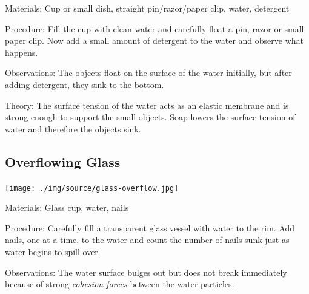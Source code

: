 \begin{multicols}{2}
\begin{description*}
\item[Materials:]{Cup or small dish, straight pin/razor/paper clip, water, detergent}
\item[Procedure:]{Fill the cup with clean water and carefully float a pin, razor or small paper clip. Now add a small amount of detergent to the water and observe what happens.}
\item[Observations:]{The objects float on the surface of the water initially, but after adding detergent, they sink to the bottom.}
\item[Theory:]{The surface tension of the water acts as an elastic membrane and is strong enough to support the small objects. Soap lowers the surface tension of water and therefore the objects sink.}
\end{description*}

\columnbreak

\subsection{Overflowing Glass}

\begin{center}
\texttt{[image: ./img/source/glass-overflow.jpg]}
\end{center}

\begin{description*}
\item[Materials:]{Glass cup, water, nails}
\item[Procedure:]{Carefully fill a transparent glass vessel with water to the rim. Add nails, one at a time, to
the water and count the number of nails sunk just as water begins to spill over.}
\item[Observations:]{The water surface bulges out but does not break immediately because of strong \emph{cohesion
forces} between the water particles.}
\end{description*}


\end{multicols}

